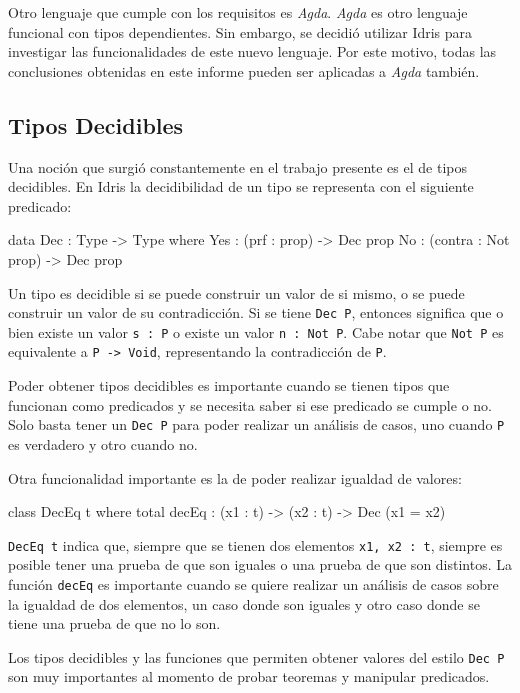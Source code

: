 Otro lenguaje que cumple con los requisitos es \textit{Agda}. \textit{Agda} es otro lenguaje funcional con tipos dependientes. Sin embargo, se decidió utilizar Idris para investigar las funcionalidades de este nuevo lenguaje.
Por este motivo, todas las conclusiones obtenidas en este informe pueden ser aplicadas a \textit{Agda} también.

\subsection{Tipos Decidibles}

Una noción que surgió constantemente en el trabajo presente es el de tipos decidibles. En Idris la decidibilidad de un tipo se representa con el siguiente predicado:

\begin{code}
data Dec : Type -> Type where
  Yes : (prf : prop) -> Dec prop
  No  : (contra : Not prop) -> Dec prop
\end{code}

Un tipo es decidible si se puede construir un valor de si mismo, o se puede construir un valor de su contradicción. Si se tiene \texttt{Dec P}, entonces significa que o bien existe un valor \texttt{s : P} o existe un valor \texttt{n : Not P}. Cabe notar que \texttt{Not P} es equivalente a \texttt{P -> Void}, representando la contradicción de \texttt{P}.

Poder obtener tipos decidibles es importante cuando se tienen tipos que funcionan como predicados y se necesita saber si ese predicado se cumple o no. Solo basta tener un \texttt{Dec P} para poder realizar un análisis de casos, uno cuando \texttt{P} es verdadero y otro cuando no.

Otra funcionalidad importante es la de poder realizar igualdad de valores:

\begin{code}
class DecEq t where
  total decEq : (x1 : t) -> (x2 : t) -> Dec (x1 = x2)
\end{code}

\texttt{DecEq t} indica que, siempre que se tienen dos elementos \texttt{x1, x2 : t}, siempre es posible tener una prueba de que son iguales o una prueba de que son distintos. La función \texttt{decEq} es importante cuando se quiere realizar un análisis de casos sobre la igualdad de dos elementos, un caso donde son iguales y otro caso donde se tiene una prueba de que no lo son.

Los tipos decidibles y las funciones que permiten obtener valores del estilo \texttt{Dec P} son muy importantes al momento de probar teoremas y manipular predicados.
